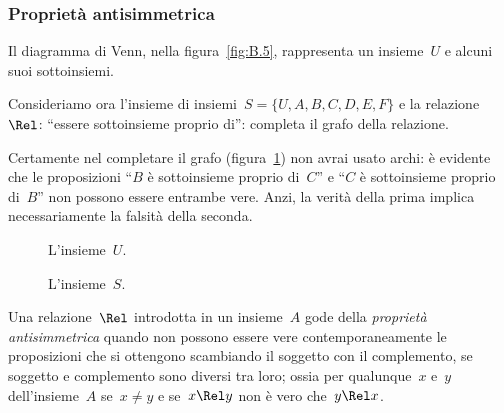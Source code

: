 
\subsubsection{Proprietà antisimmetrica}

\begin{exrig}
 \begin{esempio}

Il diagramma di Venn, nella figura~\ref{fig:B.5}, rappresenta un insieme~$U$ e 
alcuni suoi sottoinsiemi.

Consideriamo ora l'insieme di insiemi~$S = \lbrace U, A, B, C, D, E, F \rbrace$ 
e la relazione~$\Rel$: ``essere sottoinsieme proprio di'':
completa il grafo della relazione.

Certamente nel completare il grafo (figura~\ref{fig:B.6}) non avrai usato archi: 
è evidente che le proposizioni ``$B$ è sottoinsieme proprio di~$C$'' e ``$C$
è sottoinsieme proprio di~$B$'' non possono essere entrambe vere. Anzi, la 
verità della prima implica necessariamente la falsità della seconda.
 \end{esempio}
\end{exrig}

\begin{inaccessibleblock}
 \begin{figure}[b]
\begin{minipage}[b]{.45\textwidth}
 \centering
 
 \caption{L'insieme~$U$.}\label{fig:B.5}
\end{minipage}\hfil
\begin{minipage}[b]{.45\textwidth}
 \centering
 
 \caption{L'insieme~$S$.}\label{fig:B.6}
\end{minipage}
\end{figure}
\end{inaccessibleblock}

\begin{definizione}
Una relazione~$\Rel$ introdotta in un insieme~$A$ gode della \emph{proprietà 
antisimmetrica} quando non possono essere vere
contemporaneamente le proposizioni che si ottengono scambiando il soggetto con 
il complemento, se soggetto e complemento sono diversi
tra loro; ossia per qualunque~$x$ e~$y$ dell'insieme~$A$ se~$x \neq y$ e se~$x 
\Rel y$ non è vero che~$y \Rel x$.
\end{definizione}


